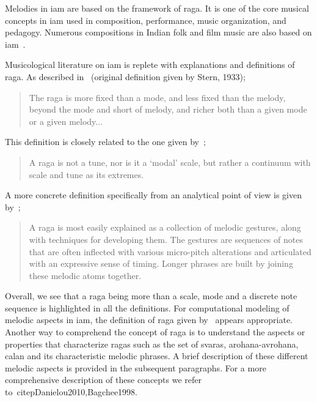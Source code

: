 Melodies in \gls{iam} are based on the framework of \gls{raga}. It is one of the core musical concepts in \gls{iam} used in composition, performance, music organization, and pedagogy. Numerous compositions in Indian folk and film music are also based on \gls{iam}~\citep{ganti2013bollywood}.

Musicological literature on \gls{iam} is replete with explanations and definitions of \gls{raga}. As described in~\cite[p. 96]{martinez2001semiosis} (original definition given by Stern, 1933);

\blockquote{The \gls{raga} is more fixed than a mode, and less fixed than the melody, beyond the mode and short of melody, and richer both than a given mode or a given melody...}

This definition is closely related to the one given by~\cite{powers1963background};

\blockquote{A \gls{raga} is not a tune, nor is it a `modal' scale, but rather a continuum with scale and tune as its extremes.}

A more concrete definition specifically from an analytical point of view is given by~\cite{chordia2013joint};

\blockquote{A \gls{raga} is most easily explained as a collection of melodic gestures, along with techniques for developing them. The gestures are sequences of notes that are often inflected with various micro-pitch alterations and articulated with an expressive sense of timing. Longer phrases are built by joining these melodic atoms together.}

Overall, we see that a \gls{raga} being more than a scale, mode and a discrete note sequence is highlighted in all the definitions. For computational modeling of melodic aspects in \gls{iam}, the definition of \gls{raga} given by~\cite{chordia2013joint} appears appropriate. Another way to comprehend the concept of \gls{raga} is to understand the aspects or properties that characterize \glspl{raga} such as the set of \glspl{svara}, \gls{arohana}-\gls{avrohana}, calan and its characteristic melodic phrases. A brief description of these different melodic aspects is provided in the subsequent paragraphs. For a more comprehensive description of these concepts we refer to~citep{Danielou2010,Bagchee1998}.


